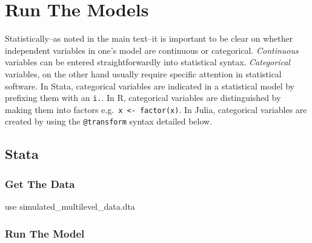 \documentclass[
  letterpaper,
  DIV=11,
  numbers=noendperiod]{scrreprt}
\newenvironment{Shaded}{\begin{snugshade}}{\end{snugshade}}
\newcommand{\KeywordTok}[1]{\textcolor[rgb]{0.00,0.23,0.31}{#1}}
\newcommand{\NormalTok}[1]{\textcolor[rgb]{0.00,0.23,0.31}{#1}}
\begin{document}
\section{Run The Models}\label{run-the-models}

\begin{tcolorbox}[enhanced jigsaw, toptitle=1mm, title=\textcolor{quarto-callout-warning-color}{\faExclamationTriangle}\hspace{0.5em}{Continuous and Categorical Variables}, arc=.35mm, colbacktitle=quarto-callout-warning-color!10!white, left=2mm, breakable, toprule=.15mm, colback=white, opacityback=0, colframe=quarto-callout-warning-color-frame, leftrule=.75mm, opacitybacktitle=0.6, bottomtitle=1mm, titlerule=0mm, rightrule=.15mm, coltitle=black, bottomrule=.15mm]

Statistically--as noted in the main text--it is important to be clear on
whether independent variables in one's model are continuous or
categorical. \emph{Continuous} variables can be entered
straightforwardly into statistical syntax. \emph{Categorical} variables,
on the other hand usually require specific attention in statistical
software. In Stata, categorical variables are indicated in a statistical
model by prefixing them with an \texttt{i.}. In R, categorical variables
are distinguished by making them into factors
e.g.~\texttt{x\ \textless{}-\ factor(x)}. In Julia, categorical
variables are created by using the \texttt{@transform} syntax detailed
below.

\end{tcolorbox}

\subsection{Stata}

\subsubsection{Get The Data}\label{get-the-data}

\begin{Shaded}
\begin{Highlighting}[]

\KeywordTok{use}\NormalTok{ simulated\_multilevel\_data.dta}
\end{Highlighting}
\end{Shaded}

\subsubsection{Run The Model}\label{run-the-model}
\end{document}
